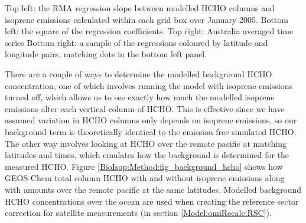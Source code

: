     { %
      Top left: the RMA regression slope between modelled HCHO columns and isoprene emissions calculated within each grid box over January 2005.
      Bottom left: the square of the regression coefficients.
      Top right: Australia averaged time series 
      Bottom right: a sample of the regressions coloured by latitude and longitude pairs, matching dots in the bottom left panel.
    }
    {\label{BioIsop:Method:slope:fig_regressions}}
    
    
    
    There are a couple of ways to determine the modelled background HCHO concentration, one of which involves running the model with isoprene emissions turned off, which allows us to see exactly how much the modelled isoprene emissions alter each vertical column of HCHO.
    This is effective since we have assumed variation in HCHO columns only depends on isoprene emissions, so our background term is theoretically identical to the emission free simulated HCHO.
    The other way involves looking at HCHO over the remote pacific at matching latitudes and times, which emulates how the background is determined for the measured HCHO.
    Figure \ref{BioIsop:Method:fig_background_hcho} shows how GEOS-Chem total column HCHO with and without isoprene emissions along with amounts over the remote pacific at the same latitudes.
    Modelled background HCHO concentrations over the ocean are used when creating the reference sector correction for satellite measurements (in section \ref{Model:omiRecalc:RSC}).
    
